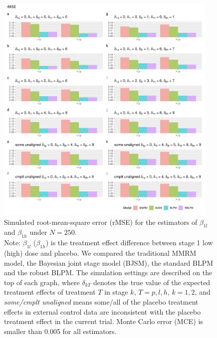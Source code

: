 \begin{figure}
\includegraphics[width=0.95\textwidth]{chapters/figures/rMSE_250.pdf}
\caption{Simulated root-mean-square error (rMSE) for the estimators of $\beta_{1l}$ and $\beta_{1h}$ under $N = 250$.\\ Note: $\beta_{1l}$ ($\beta_{1h}$) is the treatment effect difference between stage 1 low (high) dose and placebo. We compared the traditional MMRM model, the Bayesian joint stage model (BJSM), the standard BLPM and the robust BLPM. The simulation settings are described on the top of each graph, where $\delta_{kT}$ denotes the true value of the expected treatment effects of treatment $T$ in stage $k$, $T = p, l, h$, $k = 1, 2$, and \emph{some/cmplt unaligned} means some/all of the placebo treatment effects in external control data are inconsistent with the placebo treatment effect in the current trial. Monte Carlo error (MCE) is smaller than 0.005 for all estimators. }
\label{fig:rMSE_250}
\end{figure}


